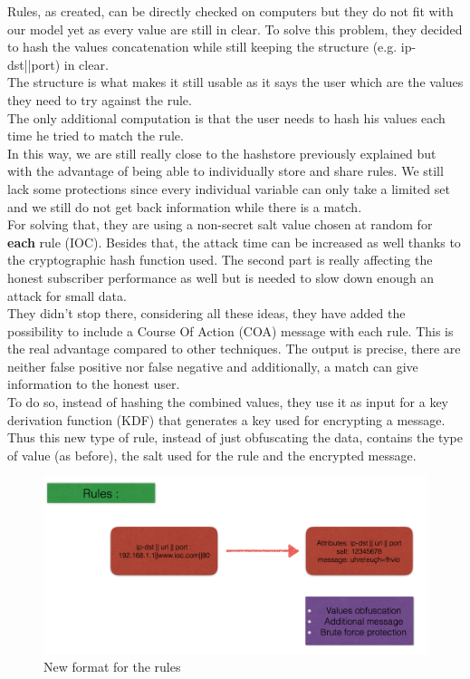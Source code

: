 \documentclass{eplmastersthesis}
\begin{document}
Rules, as created, can be directly checked on computers but they do not fit with our model yet as every value are still in clear. To solve this problem, they decided to hash the values concatenation while still keeping the structure (e.g. ip-dst||port) in clear.\\
The structure is what makes it still usable as it says the user which are the values they need to try against the rule.\\
The only additional computation is that the user needs to hash his values each time he tried to match the rule.\\
In this way, we are still really close to the hashstore previously explained but with the advantage of being able to individually store and share rules. We still lack some protections since every individual variable can only take a limited set and we still do not get back information while there is a match.\\
For solving that, they are using a non-secret salt value chosen at random for \textbf{each} rule (IOC). Besides that, the attack time can be increased as well thanks to the cryptographic hash function used. The second part is really affecting the honest subscriber performance as well but is needed to slow down enough an attack for small data.\\

They didn't stop there, considering all these ideas, they have added the possibility to include a Course Of Action (COA) message with each rule. This is the real advantage compared to other techniques. The output is precise, there are neither false positive nor false negative and additionally, a match can give information to the honest user.\\ To do so, instead of hashing the combined values, they use it as input for a key derivation function (KDF) that generates a key used for encrypting a message.\\
Thus this new type of rule, instead of just obfuscating the data, contains the type of value (as before), the salt used for the rule and the encrypted message.\\


\begin{figure}[h!]
\begin{center}
	\includegraphics[scale=0.5]{res/obfuscation-rule}
	\caption{New format for the rules}
	\label{Obfuscation-Rule}
\end{center}
\end{figure}
\end{document}
